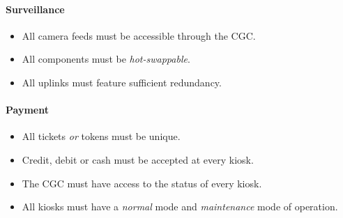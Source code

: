 \documentclass[12pt]{article}
\begin{document}
    \paragraph{Surveillance}
    \begin{itemize}
        \item[] All camera feeds must be accessible through the CGC.
        \item[] All components must be \textit{hot-swappable}.
        \item[] All uplinks must feature sufficient redundancy. 
    \end{itemize}
    
    \paragraph{Payment}
    \begin{itemize}
        \item[] All tickets \textit{or} tokens must be unique.
        \item[] Credit, debit or cash must be accepted at every kiosk.
        \item[] The CGC must have access to the status of every kiosk.
        \item[] All kiosks must have a \textit{normal} mode and \textit{maintenance} mode of operation.
    \end{itemize}
    
\end{document}
